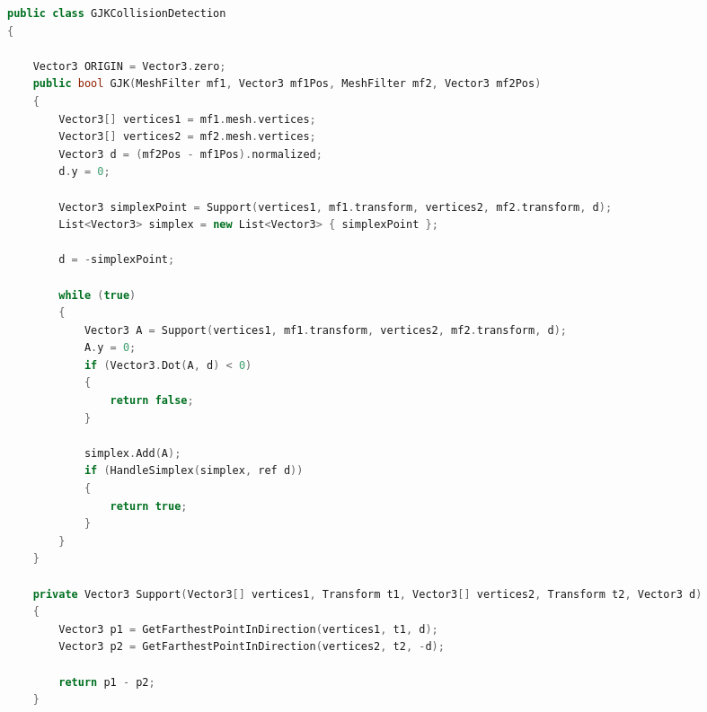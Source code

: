 \begin{adjustbox}{width=\textwidth}
\begin{lstlisting}[language=C++]
    public class GJKCollisionDetection
{ 

    Vector3 ORIGIN = Vector3.zero;
    public bool GJK(MeshFilter mf1, Vector3 mf1Pos, MeshFilter mf2, Vector3 mf2Pos)
    {
        Vector3[] vertices1 = mf1.mesh.vertices;
        Vector3[] vertices2 = mf2.mesh.vertices;
        Vector3 d = (mf2Pos - mf1Pos).normalized;
        d.y = 0;

        Vector3 simplexPoint = Support(vertices1, mf1.transform, vertices2, mf2.transform, d);
        List<Vector3> simplex = new List<Vector3> { simplexPoint };

        d = -simplexPoint;

        while (true)
        {
            Vector3 A = Support(vertices1, mf1.transform, vertices2, mf2.transform, d);
            A.y = 0;
            if (Vector3.Dot(A, d) < 0)
            {
                return false;
            }

            simplex.Add(A);
            if (HandleSimplex(simplex, ref d))
            {
                return true;
            }
        }
    }

    private Vector3 Support(Vector3[] vertices1, Transform t1, Vector3[] vertices2, Transform t2, Vector3 d)
    {
        Vector3 p1 = GetFarthestPointInDirection(vertices1, t1, d);
        Vector3 p2 = GetFarthestPointInDirection(vertices2, t2, -d);

        return p1 - p2;
    }
    
\end{lstlisting}
\end{adjustbox}
